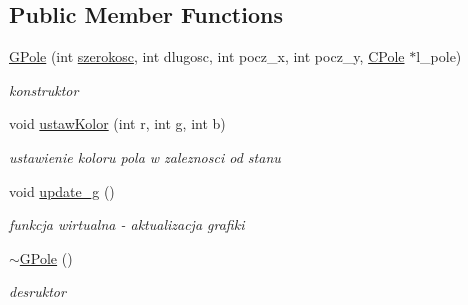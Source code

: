 \subsection*{Public Member Functions}
\begin{DoxyCompactItemize}
\item 
\mbox{\label{class_g_pole_a6271a0682e90addaae1dae8374577a7f}} 
\mbox{\hyperlink{class_g_pole_a6271a0682e90addaae1dae8374577a7f}{G\+Pole}} (int \mbox{\hyperlink{class_c_obiekt_a3b4cdd9bed92efca2156ce1e0078e76b}{szerokosc}}, int dlugosc, int pocz\+\_\+x, int pocz\+\_\+y, \mbox{\hyperlink{class_c_pole}{C\+Pole}} $\ast$l\+\_\+pole)
\begin{DoxyCompactList}\small\item\em konstruktor \end{DoxyCompactList}\item 
\mbox{\label{class_g_pole_a2375fa9d5ddccaf2a0d2827b6559753b}} 
void \mbox{\hyperlink{class_g_pole_a2375fa9d5ddccaf2a0d2827b6559753b}{ustaw\+Kolor}} (int r, int g, int b)
\begin{DoxyCompactList}\small\item\em ustawienie koloru pola w zaleznosci od stanu \end{DoxyCompactList}\item 
\mbox{\label{class_g_pole_abbec0a51dfb406a5e101c3d64bde7545}} 
void \mbox{\hyperlink{class_g_pole_abbec0a51dfb406a5e101c3d64bde7545}{update\+\_\+g}} ()
\begin{DoxyCompactList}\small\item\em funkcja wirtualna -\/ aktualizacja grafiki \end{DoxyCompactList}\item 
\mbox{\label{class_g_pole_a90c213d200c702a9780407a777d14456}} 
\mbox{\hyperlink{class_g_pole_a90c213d200c702a9780407a777d14456}{$\sim$\+G\+Pole}} ()
\begin{DoxyCompactList}\small\item\em desruktor \end{DoxyCompactList}\end{DoxyCompactItemize}
